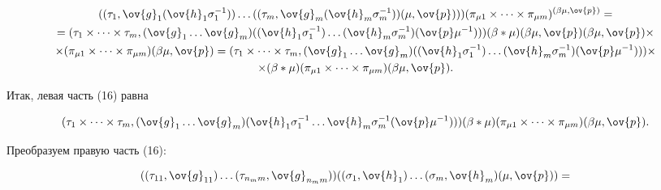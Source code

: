\begin{pf}
\begin{gather*}
(( \t_1,\ov{g}_1(\ov{h}_1 \s_1^{-1})) \dotsc


((\t_m,\ov{g}_m(\ov{h}_m \s_m^{-1}))(\mu,\ov{p})))


(\pi_{\mu1} \times \dotsb \times \pi_{\mu{m}})^{(\be\mu,\ov{p})}=\\


%


=( \t_1 \times \dotsb \times \t_m,(\ov{g}_1 \dotsc \ov{g}_m)


((\ov{h}_1 \s_1^{-1}) \dotsc (\ov{h}_m \s_m^{-1}) (\ov{p}\mu^{-1})))


(\be * \mu) (\be\mu,\ov{p}) (\be\mu,\ov{p}) \times\\


%


\times (\pi_{\mu1} \times \dotsb \times \pi_{\mu{m}})(\be\mu,\ov{p})=


( \t_1 \times \dotsb \times \t_m,(\ov{g}_1 \dotsc \ov{g}_m)


((\ov{h}_1 \s_1^{-1}) \dotsc (\ov{h}_m \s_m^{-1}) (\ov{p}\mu^{-1}))) \times\\


%


\times (\be * \mu) (\pi_{\mu1} \times \dotsb \times \pi_{\mu{m}})(\be\mu,\ov{p}).


\end{gather*}





Итак, левая часть (16) равна


\begin{equation}


( \t_1 \times \dotsb \times \t_m,(\ov{g}_1 \dotsc \ov{g}_m)


(\ov{h}_1 \s_1^{-1} \dotsc \ov{h}_m \s_m^{-1}(\ov{p}\mu^{-1})))


 (\be * \mu) (\pi_{\mu1} \times \dotsb \times \pi_{\mu{m}})(\be\mu,\ov{p}).


\end{equation}





Преобразуем правую часть (16):


\begin{multline*}


((\t_{11},\ov{g}_{11}) \dotsc (\t_{{n_m}m},\ov{g}_{{n_m}m}))


((\s_1,\ov{h}_1) \dotsc (\s_m,\ov{h}_m) (\mu,\ov{p}))=\\


%



\end{multline*}
\end{pf}
